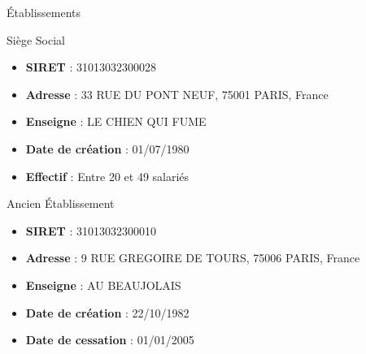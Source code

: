 \begin{frame}{Établissements}
\label{uxe9tablissements}
\begin{block}{Siège Social}
\label{siuxe8ge-social}
\begin{itemize}
\tightlist
\item
  \textbf{SIRET} : 31013032300028
\item
  \textbf{Adresse} : 33 RUE DU PONT NEUF, 75001 PARIS, France
\item
  \textbf{Enseigne} : LE CHIEN QUI FUME
\item
  \textbf{Date de création} : 01/07/1980
\item
  \textbf{Effectif} : Entre 20 et 49 salariés
\end{itemize}
\end{block}

\begin{block}{Ancien Établissement}
\label{ancien-uxe9tablissement}
\begin{itemize}
\tightlist
\item
  \textbf{SIRET} : 31013032300010
\item
  \textbf{Adresse} : 9 RUE GREGOIRE DE TOURS, 75006 PARIS, France
\item
  \textbf{Enseigne} : AU BEAUJOLAIS
\item
  \textbf{Date de création} : 22/10/1982
\item
  \textbf{Date de cessation} : 01/01/2005
\end{itemize}
\end{block}
\end{frame}

